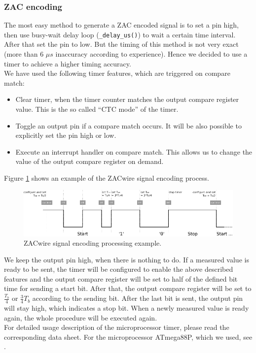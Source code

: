 \documentclass[a4paper]{scrreprt}
\begin{document}
\subsubsection{ZAC encoding}
The most easy method to generate a ZAC encoded signal is to set a pin high, then use busy-wait delay loop (\texttt{\_delay\_us()}) to wait a certain time interval. After that set the pin to low. 
But the timing of this method is not very exact (more than 6 $\mu s$ inaccuracy according to experience). Hence we decided to use a timer to achieve a higher timing accuracy. \\
We have used the following timer features, which are triggered on compare match: 
\begin{itemize}
  \item Clear timer, when the timer counter matches the output compare register value. This is the so called ``CTC mode'' of the timer.
  \item Toggle an output pin if a compare match occurs. It will be also possible to explicitly set the pin high or low.
  \item Execute an interrupt handler on compare match. This allows us to change the value of the output compare register on demand.
\end{itemize}
Figure \ref{fig:zac_encoding} shows an example of the ZACwire signal encoding process.\\
\begin{figure}[Hh!]
	\centering
	\includegraphics[width=\textwidth]{img/zac_encoding.pdf}
	\caption{ZACwire signal encoding processing example.}
	\label{fig:zac_encoding}
\end{figure}
We keep the output pin high, when there is nothing to do.
If a measured value is ready to be sent, the timer will be configured to enable the above described features and the output compare register will be set to half of the defined bit time for sending a start bit.
After that, the output compare register will be set to $\frac{T_{b}}{4}$ or $\frac{3}{4}T_{b}$ according to the sending bit.
After the last bit is sent, the output pin will stay high, which indicates a stop bit. 
When a newly measured value is ready again, the whole procedure will be executed again.
\\
For detailed usage description of the microprocessor timer, please read the corresponding data sheet. For the microprocessor ATmega88P, which we used, see \cite{atmega88}. 
\end{document}
